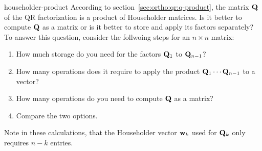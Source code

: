 \begin{Problem}{householder-product}
  According to section~\ref{sec:ortho:qr:q-product}, the matrix
  $\mathbf Q$ of the QR factorization is a product of Householder
  matrices. Is it better to compute $\mathbf Q$ as a matrix or is it
  better to store and apply its factors separately? To answer this
  question, consider the follwoing steps for an $n\times n$ matrix:
  \begin{enumerate}
  \item How much storage do you need for the factors $\mathbf Q_1$ to $\mathbf Q_{n-1}$?
  \item How many operations does it require to apply the product
    $\mathbf Q_1\cdots\mathbf Q_{n-1}$ to a vector?
  \item How many operations do you need to compute $\mathbf Q$ as a matrix?
  \item Compare the two options.
  \end{enumerate}
  Note in these calculations, that the Householder vector $\mathbf w_k$ used
  for $\mathbf Q_k$ only requires $n-k$ entries.
\end{Problem}

